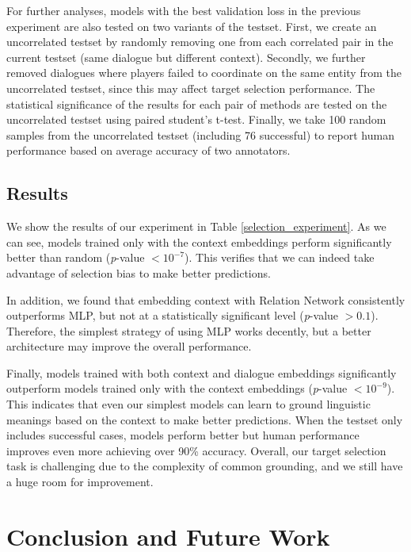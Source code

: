 \documentclass[letterpaper]{article}
\begin{document}
For further analyses, models with the best validation loss in the previous experiment are also tested on two variants of the testset. First, we create an uncorrelated testset by randomly removing one from each correlated pair in the current testset (same dialogue but different context). Secondly, we further removed dialogues where players failed to coordinate on the same entity from the uncorrelated testset, since this may affect target selection performance. The statistical significance of the results for each pair of methods are tested on the uncorrelated testset using paired student's t-test. Finally, we take 100 random samples from the uncorrelated testset (including 76 successful) to report human performance based on average accuracy of two annotators.

\subsection{Results}

We show the results of our experiment in Table \ref{selection_experiment}. As we can see, models trained only with the context embeddings perform significantly better than random (\textit{p}-value $<10^{-7}$). This verifies that we can indeed take advantage of selection bias to make better predictions.

In addition, we found that embedding context with Relation Network consistently outperforms MLP, but not at a statistically significant level (\textit{p}-value $>0.1$). Therefore, the simplest strategy of using MLP works decently, but a better architecture may improve the overall performance.

Finally, models trained with both context and dialogue embeddings significantly outperform models trained only with the context embeddings (\textit{p}-value $<10^{-9}$). This indicates that even our simplest models can learn to ground linguistic meanings based on the context to make better predictions. When the testset only includes successful cases, models perform better but human performance improves even more achieving over 90\% accuracy. Overall, our target selection task is challenging due to the complexity of common grounding, and we still have a huge room for improvement.

\section{Conclusion and Future Work}
\label{section:conclusion}
\end{document}
